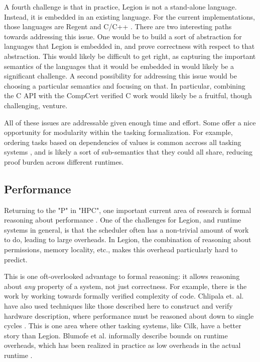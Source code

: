 \documentclass[sigconf]{acmart}
\begin{document}
A fourth challenge is that in practice, Legion is not a stand-alone language.
Instead, it is embedded in an existing language. For the current implementations, 
those languages are Regent and C/C++ \cite{regent, legion}. There are two 
interesting paths towards addressing this issue. One would be to build a sort 
of abstraction for languages that Legion is embedded in, and prove correctness
with respect to that abstraction. This would likely be difficult to get right, as 
capturing the important semantics of the languages that it would be embedded in
would likely be a significant challenge. A second possibility for addressing this 
issue would be choosing a particular semantics and focusing on that. In particular,
combining the C API with the CompCert verified C work would likely be a
fruitful, though challenging, venture. 

All of these issues are addressable given enough time and effort. Some offer
a nice opportunity for modularity within the tasking formalization. For example, 
ordering tasks based on dependencies of values is common accross all tasking
systems \cite{cilk, hpx}, and is likely a sort of sub-semantics that they could
all share, reducing proof burden across different runtimes.

\subsection{Performance}

Returning to the "P" in "HPC", one important current area of research is formal
reasoning about performance \cite{performance}. One of the challenges for
Legion, and runtime systems in general, is that the scheduler often has a
non-trivial amount of work to do, leading to large overheads. In Legion, the
combination of reasoning about permissions, memory locality, etc., makes this
overhead particularly hard to predict. 

This is one oft-overlooked advantage to formal reasoning: it allows reasoning
about \emph{any} property of a system, not just correctness. For example, there
is the work by \cite{?} working towards formally verified complexity of code.
Chlipala et. al. have also used techniques like those described here to construct
and verify hardware description, where performance must be reasoned about down
to single cycles \cite{chlipala}.  This is one area where other tasking
systems, like Cilk, have a better story than Legion. Blumofe et al. informally
describe bounds on runtime overheads, which has been realized in practice as
low overheads in the actual runtime \cite{cilk}. 
\end{document}
